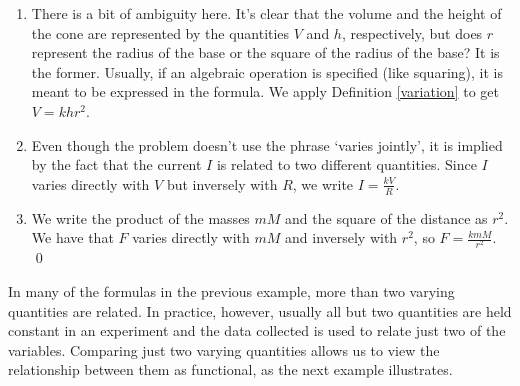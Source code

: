 \begin{ex}
\begin{enumerate}
\item  There is a bit of ambiguity here.  It's clear that the volume and the height of the cone are represented by the quantities $V$ and $h$, respectively, but does $r$ represent the radius of the base or the square of the radius of the base?  It is the former.  Usually, if an algebraic operation is specified (like squaring), it is meant to be expressed in the formula.  We apply Definition \ref{variation} to get $V = k h r^{2}$.  

\item  Even though the problem doesn't use the phrase `varies jointly', it is implied by the fact that the current $I$ is related to two different quantities.  Since $I$ varies directly with $V$ but inversely with $R$, we write $I = \frac{k V}{R}$.

\item We write the product of the masses $mM$ and the square of the distance as $r^2$.  We have that $F$ varies directly with $mM$ and inversely with $r^2$, so $F = \frac{kmM}{r^2}$.  \qed

\end{enumerate}

\end{ex}

In many of the formulas in the previous example, more than two varying quantities are related.  In practice, however, usually all but two quantities are held constant in an experiment and the data collected is used to relate just two of the variables.  Comparing just two varying quantities allows us to view the relationship between them as functional, as the next example illustrates.

